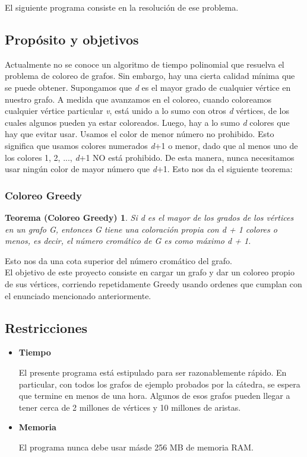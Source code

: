 \documentclass[11pt,a4paper]{article}
\theoremstyle{plain}
\begin{document}
 El siguiente programa consiste en la resolución de ese problema.

	\subsection{Propósito y objetivos}

Actualmente no se conoce un algoritmo de tiempo polinomial que resuelva el problema de coloreo de grafos. Sin embargo, hay una cierta calidad mínima que se puede obtener. Supongamos que \emph{d} es el mayor grado de cualquier vértice en nuestro grafo. A medida que avanzamos en el coloreo, cuando coloreamos cualquier vértice particular \emph{v}, está unido a lo sumo con otros \emph{d} vértices, de los cuales algunos pueden ya estar coloreados. Luego, hay a lo sumo \emph{d} colores que hay que evitar usar. Usamos el color de menor número no prohibido. Esto significa que usamos colores numerados \emph{d}+1 o menor, dado que al menos uno de los colores 1, 2, ..., \emph{d}+1 NO está prohibido. De esta manera, nunca necesitamos usar ningún color de mayor número que \emph{d}+1. Esto nos da el siguiente teorema:

\subsubsection{Coloreo Greedy}
\newtheorem*{Teorema*}{Teorema (Coloreo Greedy)}

\begin{Teorema*}
Si d es el mayor de los grados de los vértices en un grafo G, entonces G tiene una coloración propia con d + 1 colores o menos, es decir, el número cromático de G es como máximo d + 1.
\end{Teorema*}

 Esto nos da una cota superior del número cromático del grafo\cite {4}.\\

El objetivo de este proyecto consiste en cargar un grafo y dar un coloreo propio de sus vértices, corriendo repetidamente Greedy usando ordenes que cumplan con el enunciado mencionado anteriormente.

	\subsection{Restricciones}

\begin{itemize}

\item\textbf{{Tiempo}}

El presente programa está estipulado para ser razonablemente rápido. En particular, con todos los grafos de ejemplo probados por la cátedra, se espera que termine en menos de una hora. Algunos de esos grafos pueden llegar a tener cerca de 2 millones de vértices y 10 millones de aristas.

\item\textbf{{Memoria}}

El programa nunca debe usar másde 256 MB de memoria RAM.

\end{itemize}
\end{document}
